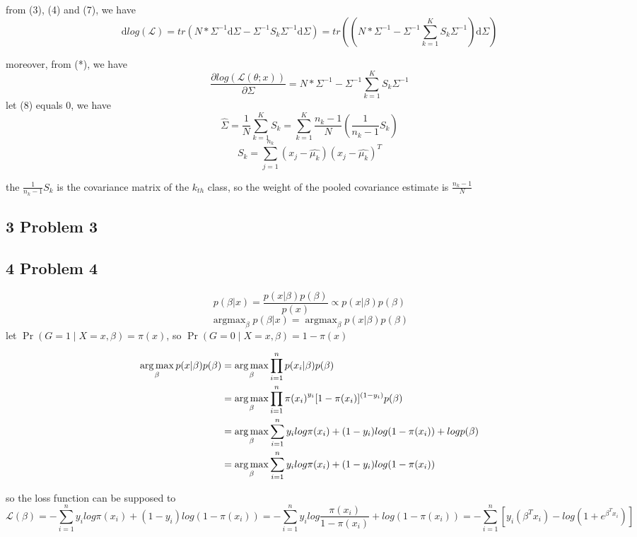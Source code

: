 \documentclass[10pt,a4paper]{article}
\begin{document}
from (3), (4) and (7), we have
\[ \mathrm{d}log(\mathcal{L})=tr(N*\Sigma^{-1}\mathrm{d}\Sigma-\Sigma^{-1}S_k\Sigma^{-1}\mathrm{d}\Sigma)=tr((N*\Sigma^{-1}-\Sigma^{-1}\sum_{k=1}^{K}S_k\Sigma^{-1})\mathrm{d}\Sigma) \]

moreover, from (*), we have
\[ \frac{\partial log(\mathcal{L}(\theta;x))}{\partial \Sigma}=N*\Sigma^{-1}-\Sigma^{-1}\sum_{k=1}^{K}S_k\Sigma^{-1}
\tag{8} \]
let (8) equals 0, we have
\[ \hat{\Sigma}=\frac{1}{N}\sum_{k=1}^{K}S_k=\sum_{k=1}^{K}\frac{n_k-1}{N}(\frac{1}{n_k-1}S_k)  \]
\[ S_k=\sum_{j=1}^{n_k}(x_j-\hat{\mu_{k}})(x_j-\hat{\mu_{k}})^T \]

the $ \frac{1}{n_k-1}S_k $ is the covariance matrix of the $k_{th}$ class, so the weight of the pooled covariance estimate is $\frac{n_k-1}{N}$


\subsection{3 Problem 3}



\subsection{4 Problem 4}
\[ p(\beta|x)=\frac{p(x|\beta)p(\beta)}{p(x)} \propto p(x|\beta)p(\beta) \] 
\[ \mathop{\arg\max}_{\beta}p(\beta|x)=\mathop{\arg\max}_{\beta} p(x|\beta)p(\beta) \] 
let $\operatorname{Pr}(G=1 \mid X=x, \beta) = \pi(x)$, so $\operatorname{Pr}(G=0 \mid X=x, \beta) = 1- \pi(x)$

\begin{align}
	\mathop{\arg\max}_{\beta} p(x|\beta)p(\beta)
	& = \mathop{\arg\max}_{\beta} \prod_{i=1}^{n}p(x_i|\beta)p(\beta) \notag \\
	& = \mathop{\arg\max}_{\beta} \prod_{i=1}^{n}{\pi(x_i)}^{y_i}[1-\pi(x_i)]^{(1-y_i)}p(\beta) \notag \\
	& = \mathop{\arg\max}_{\beta}\sum_{i=1}^{n}y_i log\pi(x_i)+(1-y_i)log(1-\pi(x_i))+logp(\beta)	\notag \\
	& = \mathop{\arg\max}_{\beta}\sum_{i=1}^{n}y_i log\pi(x_i)+(1-y_i)log(1-\pi(x_i))	\notag 
\end{align}

so the loss function can be supposed to
\[ \mathcal{L}(\beta)=-\sum_{i=1}^{n}y_i log\pi(x_i)+(1-y_i)log(1-\pi(x_i))= -\sum_{i=1}^{n}y_i log\frac{\pi(x_i)}{1-\pi(x_i)}+log(1-\pi(x_i))= -\sum_{i=1}^{n}[y_i (\beta^Tx_i)-log(1+e^{\beta^Tx_i})] \]
\end{document}
